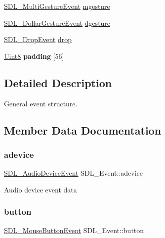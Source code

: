 \begin{DoxyCompactItemize}
\hyperlink{struct_s_d_l___multi_gesture_event}{S\+D\+L\+\_\+\+Multi\+Gesture\+Event} \hyperlink{union_s_d_l___event_ac19b3c6a6b5181a51eb4fbe2cbe726a9}{mgesture}
\item 
\hyperlink{struct_s_d_l___dollar_gesture_event}{S\+D\+L\+\_\+\+Dollar\+Gesture\+Event} \hyperlink{union_s_d_l___event_a4481167b9f8549aeb254e97ca812e74d}{dgesture}
\item 
\hyperlink{struct_s_d_l___drop_event}{S\+D\+L\+\_\+\+Drop\+Event} \hyperlink{union_s_d_l___event_acff77bccbca65abbb876360a3f5209c9}{drop}
\item 
\mbox{\label{union_s_d_l___event_aabb599570edfa54aad6255c1f24f2ad2}} 
\hyperlink{_s_d_l__stdinc_8h_a2944638813a090aa23e62f4da842c3e2}{Uint8} {\bfseries padding} \mbox{[}56\mbox{]}
\end{DoxyCompactItemize}


\subsection{Detailed Description}
General event structure. 

\subsection{Member Data Documentation}
\mbox{\label{union_s_d_l___event_a111e01fcac4fd8e251a6058ff9f17e72}} 
\subsubsection{\texorpdfstring{adevice}{adevice}}
{\footnotesize\ttfamily \hyperlink{struct_s_d_l___audio_device_event}{S\+D\+L\+\_\+\+Audio\+Device\+Event} S\+D\+L\+\_\+\+Event\+::adevice}

Audio device event data \mbox{\label{union_s_d_l___event_ab6da2fa2687e5f849f270adecc64785f}} 
\subsubsection{\texorpdfstring{button}{button}}
{\footnotesize\ttfamily \hyperlink{struct_s_d_l___mouse_button_event}{S\+D\+L\+\_\+\+Mouse\+Button\+Event} S\+D\+L\+\_\+\+Event\+::button}


